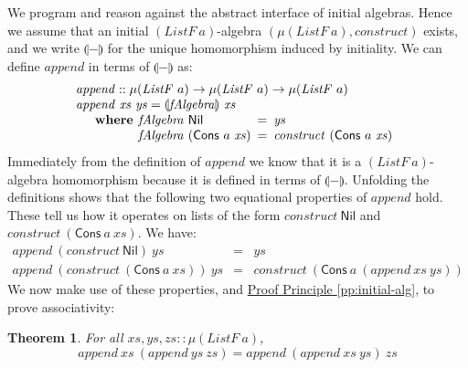\documentclass{jfp1}
\newcommand{\fold}[1]{\llparenthesis #1 \rrparenthesis}
\newtheorem{theorem}{Theorem}
\newcommand{\proofprinref}[1]{\hyperref[#1]{Proof Principle \ref*{#1}}}
\newcommand{\kw}[1]{\textbf{#1}}
\begin{document}
We program and reason against the abstract interface of initial
algebras. Hence we assume that an initial $(\mathit{ListF}~a)$-algebra
$(\mu(\mathit{ListF}~a), \mathit{construct})$ exists, and we write
$\fold{-}$ for the unique homomorphism induced by initiality. We can
define $\mathit{append}$ in terms of $\fold{-}$ as:
\begin{displaymath}
  \begin{array}{l}
    \mathit{append} :: \mu(\mathit{ListF}~a) \to \mu(\mathit{ListF}~a) \to \mu(\mathit{ListF}~a) \\
    \mathit{append}~\mathit{xs}~\mathit{ys} = \fold{\mathit{fAlgebra}}~\mathit{xs} \\
    \quad\begin{array}{r@{\hspace{0.4em}}l@{\hspace{0.5em}}c@{\hspace{0.5em}}l}
      \kw{where} & \mathit{fAlgebra}~\mathsf{Nil} &=& \mathit{ys} \\
                     & \mathit{fAlgebra}~(\mathsf{Cons}~a~\mathit{xs}) &=& \mathit{construct}~(\mathsf{Cons}~a~\mathit{xs})
    \end{array}
  \end{array}
\end{displaymath}
Immediately from the definition of $\mathit{append}$ we know that it
is a $(\mathit{ListF}~a)$-algebra homomorphism because it is defined
in terms of $\fold{-}$. Unfolding the definitions shows that the
following two equational properties of $\mathit{append}$ hold. These
tell us how it operates on lists of the form
$\mathit{construct}~\mathsf{Nil}$ and
$\mathit{construct}~(\mathsf{Cons}~a~\mathit{xs})$. We have:
\begin{eqnarray}
  \label{eq:append-nil}
  \mathit{append}~(\mathit{construct}~\mathsf{Nil})~\mathit{ys} & = & \mathit{ys} \\
  \label{eq:append-cons}
  \mathit{append}~(\mathit{construct}~(\mathsf{Cons}~a~\mathit{xs}))~\mathit{ys} & = & \mathit{construct}~(\mathsf{Cons}~a~(\mathit{append}~\mathit{xs}~\mathit{ys}))
\end{eqnarray}
We now make use of these properties, and
\proofprinref{pp:initial-alg}, to prove associativity:

\begin{theorem}\label{thm:append-assoc}
  For all $\mathit{xs}, \mathit{ys}, \mathit{zs} :: \mu(\mathit{ListF}~a)$,
  \begin{displaymath}
    \mathit{append}~\mathit{xs}~(\mathit{append}~\mathit{ys}~\mathit{zs}) = \mathit{append}~(\mathit{append}~\mathit{xs}~\mathit{ys})~\mathit{zs}
  \end{displaymath}
\end{theorem}
\end{document}
